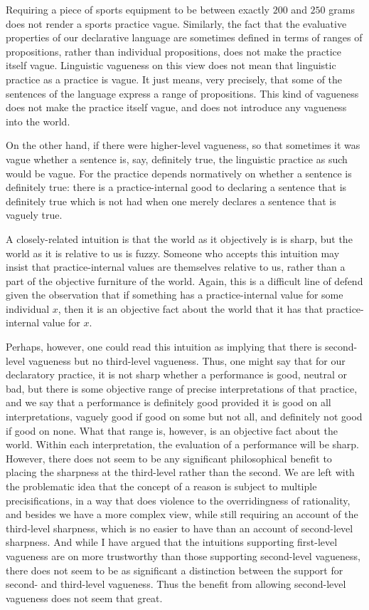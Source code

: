 Requiring a piece of sports equipment to be between exactly $200$ and $250$ grams does not render a sports practice vague.
Similarly, the fact that the evaluative properties of our declarative language are sometimes defined in terms of ranges of propositions,
rather than individual propositions, does not make the practice itself vague. Linguistic vagueness on this view does not mean that
linguistic practice as a practice is vague. It just means, very precisely, that some of the sentences of the language express a range
of propositions. This kind of vagueness does not make the practice itself vague, and does not introduce any vagueness into the world.

On the other hand, if there were higher-level vagueness, so that sometimes it was vague whether a sentence is, say, definitely true,
the linguistic practice as such would be vague. For the practice depends normatively on whether a sentence is definitely true:
there is a practice-internal good to declaring a sentence that is definitely true which is not had when one merely declares a sentence
that is vaguely true.

A closely-related intuition is that the world as it objectively is is sharp, but the world as it is relative to us is fuzzy.
Someone who accepts this intuition may insist that practice-internal values are themselves relative to us, rather than a part
of the objective furniture of the world. Again, this is a difficult line of defend given the observation that if something has
a practice-internal value for some individual $x$, then it is an objective fact about the world that it has that practice-internal 
value for $x$. 

Perhaps, however, one could read this intuition as implying that there is second-level vagueness but no third-level vagueness.
Thus, one might say that for our declaratory practice, it is not sharp whether a performance is good, neutral or bad, but 
there is some objective range of precise interpretations of that practice, and we say that a performance is definitely good 
provided it is good on all interpretations, vaguely good if good on some but not all, and definitely not good if good on none. 
What that range is, however, is an objective fact about the world. Within each interpretation, the evaluation of a performance 
will be sharp. However, there does not seem to be any significant philosophical benefit to placing the sharpness at the third-level
rather than the second. We are left with the problematic idea that the concept of a reason is subject to multiple precisifications, 
in a way that does violence to the overridingness of rationality, and besides we have a more complex view, while still requiring
an account of the third-level sharpness, which is no easier to have than an account of second-level sharpness. 
And while I have argued that the intuitions supporting first-level vagueness are on more trustworthy than those 
supporting second-level vagueness, there does not seem to be as significant a distinction between the support for
second- and third-level vagueness. Thus the benefit from allowing second-level vagueness does not seem that great.

